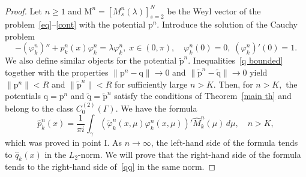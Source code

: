 \documentclass[a4paper, 12pt] {article}
\theoremstyle{plain}
\theoremstyle{remark}
\theoremstyle{plain}
\theoremstyle{definition}
\numberwithin{equation}{section}
\begin{document}
\begin{proof}
Let $n\ge1$ and ${\mathrm M}^n = [M_s^n(\lambda)]_{s=2}^N$ be the Weyl vector
of the problem~\eqref{eq}--\eqref{cont} with the potential $\mathrm{p}^n.$
Introduce
the solution of the Cauchy problem
$$-(\varphi^n_k)'' + p^n_k(x)\varphi^n_k = \lambda \varphi^n_k, \; x \in (0, \pi),
\quad \varphi^n_k(0) = 0, \; (\varphi^n_k)'(0) = 1.$$
We also define similar objects for the potential $\tilde{\mathrm{p}}^n.$ Inequalities~\eqref{q bounded} together with the properties $\| \mathrm{p}^n - \mathrm{q}\| \to 0$ and
$\| \tilde{\mathrm{p}}^n - \tilde{\mathrm{q}}\| \to 0$   yield $\| \mathrm{p}^n\| < R$ and $\| \tilde{\mathrm{p}}^n\| < R$ for sufficiently large $n >K.$ Then, for $n > K,$ the potentials $\mathrm{q}=\mathrm{p}^n$ and $\tilde{\mathrm q}=\tilde{\mathrm p}^n$ satisfy the conditions of Theorem~\ref{main th} and belong to the class $C^{(2)}_0(\Gamma).$
We have the formula
\begin{equation} \label{pred}
\hat{p}^n_k(x) = \frac{1}{\pi i} \mathop{\int}_{\gamma} (\tilde \varphi^n_k(x, \mu) \varphi^n_k(x, \mu))' \hat{M}^n_k(\mu) \, d\mu, \quad n > K,
\end{equation}
which was proved in point I.
As $n \to \infty$, the left-hand side of the formula tends to $\hat q_k(x)$ in the $L_2$-norm. We will prove that the right-hand side of the formula tends to the right-hand side of~\eqref{qq} in the same norm.


\end{proof}
\end{document}
